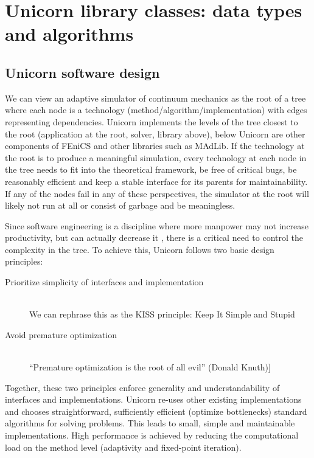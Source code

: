 \section{Unicorn library classes: data types and algorithms}

\subsection{Unicorn software design}

We can view an adaptive simulator of continuum mechanics as the root
of a tree where each node is a technology
(method/algorithm/implementation) with edges representing
dependencies. Unicorn implements the levels of the tree closest to the
root (application at the root, solver, library above), below Unicorn
are other components of FEniCS and other libraries such as MAdLib. If
the technology at the root is to produce a meaningful simulation,
every technology at each node in the tree needs to fit into the
theoretical framework, be free of critical bugs, be reasonably
efficient and keep a stable interface for its parents for
maintainability. If any of the nodes fail in any of these
perspectives, the simulator at the root will likely not run at all or
consist of garbage and be meaningless.

Since software engineering is a discipline where more manpower may not
increase productivity, but can actually decrease it \cite{Brooks1995},
there is a critical need to control the complexity in the tree. To
achieve this, Unicorn follows two basic design principles:

\begin{description}
\item[Prioritize simplicity of interfaces and implementation]
\ \\
We can rephrase this as the KISS principle: Keep It Simple and Stupid
\item[Avoid premature optimization]
\ \\
``Premature optimization is the root of all evil'' (Donald Knuth)]
\end{description}

Together, these two principles enforce generality and
understandability of interfaces and implementations. Unicorn re-uses
other existing implementations and chooses straightforward,
sufficiently efficient (optimize bottlenecks) standard algorithms for
solving problems. This leads to small, simple and maintainable
implementations. High performance is achieved by reducing the
computational load on the method level (adaptivity and fixed-point
iteration).

